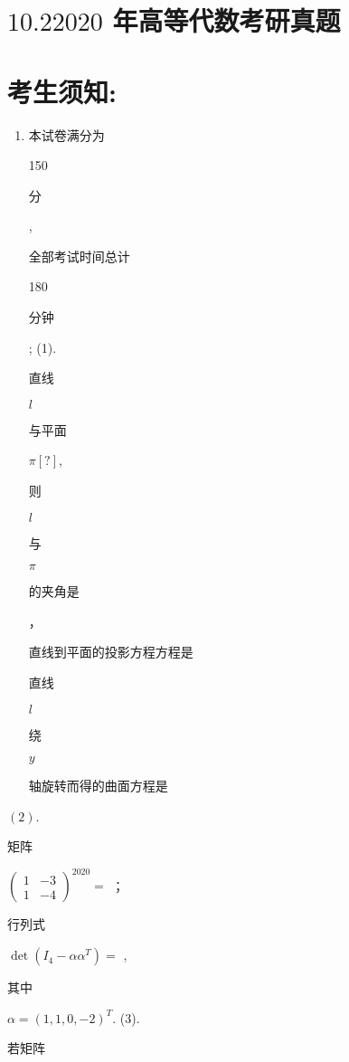 \documentclass[10pt]{article}
\begin{document}
\section{$10.22020$ 年高等代数考研真题}
\section{考生须知:}
\begin{enumerate}
  \item \begin{CJK}{UTF8}{mj}本试卷满分为\end{CJK} 150 \begin{CJK}{UTF8}{mj}分\end{CJK}, \begin{CJK}{UTF8}{mj}全部考试时间总计\end{CJK} 180 \begin{CJK}{UTF8}{mj}分钟\end{CJK}; (1). \begin{CJK}{UTF8}{mj}直线\end{CJK} $l$ \begin{CJK}{UTF8}{mj}与平面\end{CJK} $\pi[?]$, \begin{CJK}{UTF8}{mj}则\end{CJK} $l$ \begin{CJK}{UTF8}{mj}与\end{CJK} $\pi$ \begin{CJK}{UTF8}{mj}的夹角是\end{CJK} ，\begin{CJK}{UTF8}{mj}直线到平面的投影方程方程是\end{CJK} \begin{CJK}{UTF8}{mj}直线\end{CJK} $l$ \begin{CJK}{UTF8}{mj}绕\end{CJK} $y$ \begin{CJK}{UTF8}{mj}轴旋转而得的曲面方程是\end{CJK}
\end{enumerate}
$(2)$. \begin{CJK}{UTF8}{mj}矩阵\end{CJK} $\left(\begin{array}{ll}1 & -3 \\ 1 & -4\end{array}\right)^{2020}=$ ；\begin{CJK}{UTF8}{mj}行列式\end{CJK} $\operatorname{det}\left(I_{4}-\alpha \alpha^{T}\right)=$ ,\begin{CJK}{UTF8}{mj}其中\end{CJK} $\alpha=(1,1,0,-2)^{T}$. (3). \begin{CJK}{UTF8}{mj}若矩阵\end{CJK}
\end{document}
